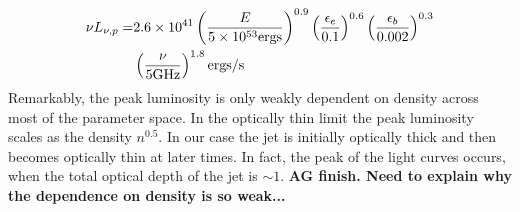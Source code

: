 \documentclass[usenatbib,fleqn]{mnras}
\begin{document}
\begin{align}
\nu L_{\nu, p}=&2.6 \times 10^{41} \left(\frac{E}{5 \times 10^{53}
    {\rm ergs}}\right)^{0.9} \left(\frac{\epsilon_e}{0.1}\right)^{0.6} \left(\frac{\epsilon_b}{0.002}\right)^{0.3}
\nonumber\\
&\left(\frac{\nu}{5 {\rm GHz}}\right)^{1.8} {\rm ergs/s}
\label{eq:peakLum}
\end{align}
%
Remarkably, the peak luminosity is only weakly dependent on density
across most of the parameter space. In the optically thin limit the
peak luminosity scales as the density $n^{0.5}$. In our case the jet
is initially optically thick and then becomes optically thin at later
times. In fact, the peak of the light curves occurs, when the total
optical depth of the jet is $\sim 1$. {\bf AG finish. Need to explain
  why the dependence on density is so weak...}
\end{document}
